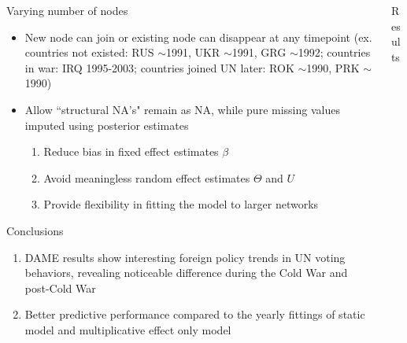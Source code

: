\documentclass[serif,mathserif,final,table]{beamer}
\begin{document}
\begin{frame}{}
\begin{columns}[t]
\begin{column}{0.235\linewidth}
    
		\begin{block}{Varying number of nodes}
		\begin{itemize}
		\item New node can join or existing node can disappear at any timepoint \small (ex. countries not existed: RUS $\sim$1991, UKR $\sim$1991, GRG $\sim$1992; countries in war: IRQ 1995-2003; countries joined UN later: ROK $\sim$1990, PRK $\sim$1990)
		\normalsize  
		\item Allow ``structural NA's" remain as NA, while pure missing values imputed using posterior estimates
        \begin{enumerate}
        \item Reduce bias in fixed effect estimates $\beta$
        \item Avoid meaningless random effect estimates $\Theta$ and $U$
        \item Provide flexibility in fitting the model to larger networks
        \end{enumerate}
		\end{itemize}
					\end{block}
						\begin{block}{Conclusions}
							\begin{enumerate}
								\item DAME results show interesting foreign policy trends in UN voting behaviors, revealing noticeable difference during the Cold War and post-Cold War
								\item Better predictive performance compared to the yearly fittings of static model \cite{minhas2016inferential} and multiplicative effect only model \cite{durante2014nonparametric}
							\end{enumerate}
						\end{block}
      	\end{column}
\begin{column}{0.235\linewidth}  
	\begin{block}{Results}


\end{block}
\end{column}
\end{columns}
\end{frame}
\end{document}
